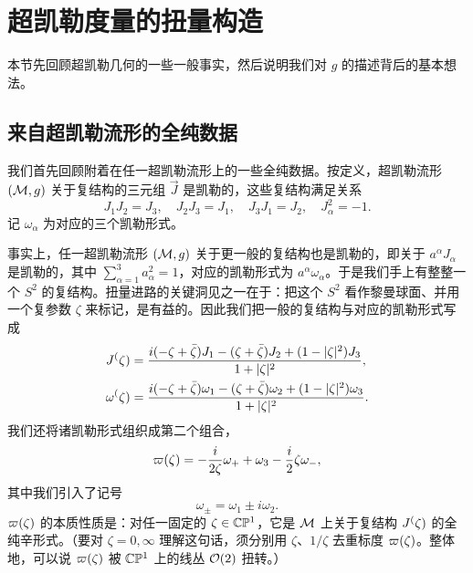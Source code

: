 \section{超凯勒度量的扭量构造}
\label{sec:twistor}

本节先回顾超凯勒几何的一些一般事实，然后说明我们对 $g$ 的描述背后的基本想法。

\subsection{来自超凯勒流形的全纯数据}
\label{sec:hk-general}

我们首先回顾附着在任一超凯勒流形上的一些全纯数据。按定义，超凯勒流形 $(\mathcal{M},g)$ 关于复结构的三元组 $\vec{J}$ 是凯勒的，这些复结构满足关系
\begin{equation} \label{eq:quaternion-complex-structures}
J_1 J_2 = J_3, \quad J_2 J_3 = J_1, \quad J_3 J_1 = J_2, \quad
J_\alpha^2 = -1.
\end{equation}
记 $\omega_\alpha$ 为对应的三个凯勒形式。

事实上，任一超凯勒流形 $(\mathcal{M},g)$ 关于更一般的复结构也是凯勒的，即关于 $a^\alpha J_\alpha$ 是凯勒的，其中 $\sum_{\alpha=1}^3 a_\alpha^2 = 1$，对应的凯勒形式为 $a^\alpha \omega_\alpha$。于是我们手上有整整一个 $S^2$ 的复结构。扭量进路的关键洞见之一在于：把这个 $S^2$ 看作黎曼球面、并用一个复参数 $\zeta$ 来标记，是有益的。因此我们把一般的复结构与对应的凯勒形式写成
\begin{align} \label{eq:Jzeta}
J^(\zeta) &= \frac{i(- \zeta + \bar\zeta)J_1 - (\zeta + \bar\zeta) J_2 + (1 - \lvert \zeta \rvert^2) J_3}{1 + \lvert  \zeta \rvert^2},\\
\omega^(\zeta) &= \frac{i(- \zeta + \bar\zeta)\omega_1 -  (\zeta + \bar\zeta) \omega_2 + (1 - \lvert \zeta \rvert^2)\omega _3}{1 + \lvert \zeta \rvert^2}.
\end{align}
我们还将诸凯勒形式组织成第二个组合，
\begin{equation} \label{eq:Omegazeta}
\varpi(\zeta) = - \frac{i}{2\zeta} \omega_+ + \omega_3 - \frac{i}{2} \zeta \omega_-,
\end{equation}
其中我们引入了记号
\begin{equation}
\omega_\pm = \omega_1 \pm i \omega_2.
\end{equation}
$\varpi(\zeta)$ 的本质性质是：对任一固定的 $\zeta \in \mathbb{C}\mathbb{P}^1$，它是 $\mathcal{M}$ 上关于复结构 $J^(\zeta)$ 的全纯辛形式。（要对 $\zeta = 0, \infty$ 理解这句话，须分别用 $\zeta$、$1/\zeta$ 去重标度 $\varpi(\zeta)$。整体地，可以说 $\varpi(\zeta)$ 被 $\mathbb{C}\mathbb{P}^1$ 上的线丛 $\mathcal{O}(2)$ 扭转。）

